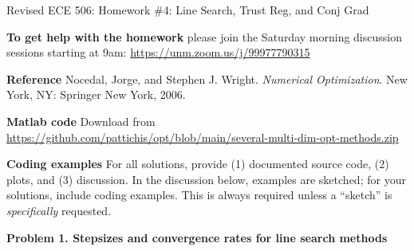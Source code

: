 \documentclass[11pt]{article}
\begin{document}
	
	\begin{center}
		{\Large Revised ECE 506: Homework \#4: Line Search, Trust Reg, and Conj Grad}\\[6pt]
	\end{center}
	
	\noindent
	\textbf{To get help with the homework} please join the Saturday morning discussion sessions starting at 9am:
	\url{https://unm.zoom.us/j/99977790315}
	
	\medskip
	\noindent
	\textbf{Reference} Nocedal, Jorge, and Stephen J. Wright. \emph{Numerical Optimization}. New York, NY: Springer New York, 2006.
	
	\medskip
	\noindent
	\textbf{Matlab code} Download from
	\url{https://github.com/pattichis/opt/blob/main/several-multi-dim-opt-methods.zip}
	
	\medskip
	\noindent
	\textbf{Coding examples} For all solutions, provide (1) documented source code, (2) plots, and (3) discussion. In the discussion below, examples are sketched; for your solutions, include coding examples. This is always required unless a ``sketch'' is \emph{specifically} requested.
	
	\medskip
	\noindent
	\textbf{Problem 1. Stepsizes and convergence rates for line search methods}
	
\end{document}

